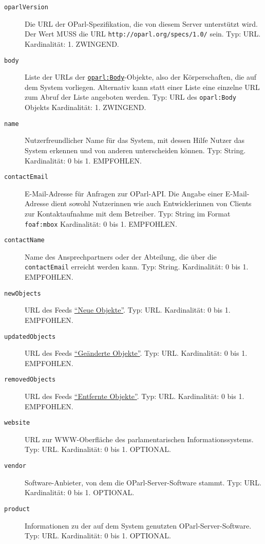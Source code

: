 \documentclass[,a4paper]{article}
\begin{document}
\begin{description}
\item[\texttt{oparlVersion}]
Die URL der OParl-Spezifikation, die von diesem Server unterstützt wird.
Der Wert MUSS die URL \texttt{http://oparl.org/specs/1.0/} sein. Typ:
URL. Kardinalität: 1. ZWINGEND.
\item[\texttt{body}]
Liste der URLs der
\hyperref[oparlux5fbody]{\texttt{oparl:Body}}-Objekte, also der
Körperschaften, die auf dem System vorliegen. Alternativ kann statt
einer Liste eine einzelne URL zum Abruf der Liste angeboten werden. Typ:
URL des \texttt{oparl:Body} Objekts Kardinalität: 1. ZWINGEND.
\item[\texttt{name}]
Nutzerfreundlicher Name für das System, mit dessen Hilfe Nutzer das
System erkennen und von anderen unterscheiden können. Typ: String.
Kardinalität: 0 bis 1. EMPFOHLEN.
\item[\texttt{contactEmail}]
E-Mail-Adresse für Anfragen zur OParl-API. Die Angabe einer
E-Mail-Adresse dient sowohl Nutzerinnen wie auch Entwicklerinnen von
Clients zur Kontaktaufnahme mit dem Betreiber. Typ: String im Format
\texttt{foaf:mbox} Kardinalität: 0 bis 1. EMPFOHLEN.
\item[\texttt{contactName}]
Name des Ansprechpartners oder der Abteilung, die über die
\texttt{contactEmail} erreicht werden kann. Typ: String. Kardinalität: 0
bis 1. EMPFOHLEN.
\item[\texttt{newObjects}]
URL des Feeds \hyperref[feedux5fneueux5fobjekte]{``Neue Objekte''}. Typ:
URL. Kardinalität: 0 bis 1. EMPFOHLEN.
\item[\texttt{updatedObjects}]
URL des Feeds \hyperref[feedux5fgeaenderteux5fobjekte]{``Geänderte
Objekte''}. Typ: URL. Kardinalität: 0 bis 1. EMPFOHLEN.
\item[\texttt{removedObjects}]
URL des Feeds \hyperref[feedux5fentfernteux5fobjekte]{``Entfernte
Objekte''}. Typ: URL. Kardinalität: 0 bis 1. EMPFOHLEN.
\item[\texttt{website}]
URL zur WWW-Oberfläche des parlamentarischen Informationssystems. Typ:
URL. Kardinalität: 0 bis 1. OPTIONAL.
\item[\texttt{vendor}]
Software-Anbieter, von dem die OParl-Server-Software stammt. Typ: URL.
Kardinalität: 0 bis 1. OPTIONAL.
\item[\texttt{product}]
Informationen zu der auf dem System genutzten OParl-Server-Software.
Typ: URL. Kardinalität: 0 bis 1. OPTIONAL.
\end{description}
\end{document}
